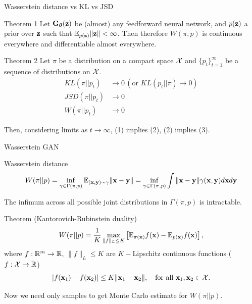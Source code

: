 \begin{frame}{Wasserstein distance vs KL vs JSD}
	\begin{block}{Theorem 1}
		Let $\mathbf{G}_{\boldsymbol{\theta}}(\mathbf{z})$ be (almost) any feedforward neural network, and $p(\mathbf{z})$ a prior over $\mathbf{z}$ such that $\mathbb{E}_{p(\mathbf{z})} \|\mathbf{z}\| < \infty$. Then therefore $W(\pi, p)$ is continuous everywhere and differentiable almost everywhere.
	\end{block}
	\begin{block}{Theorem 2}
		Let $\pi$ be a distribution on a compact space $\mathcal{X}$ and $\{p_t\}_{t=1}^\infty$ be a sequence of distributions on $\mathcal{X}$. 
		\begin{align}
			KL(\pi || p_t) &\rightarrow 0 \, (\text{or }KL (p_t || \pi) \rightarrow 0) \\
			JSD(\pi || p_t) &\rightarrow 0 \\
			W(\pi || p_t) &\rightarrow 0
		\end{align}
		
		Then, considering limits as $t \rightarrow \infty$, (1) implies (2), (2) implies (3).
	\end{block}
\end{frame}
\begin{frame}{Wasserstein GAN}
	\begin{block}{Wasserstein distance}
		\vspace{-0.5cm}
		\[
		W(\pi || p) = \inf_{\gamma \in \Gamma(\pi, p)} \mathbb{E}_{(\mathbf{x}, \mathbf{y}) \sim \gamma} \| \mathbf{x} - \mathbf{y} \| =  \inf_{\gamma \in \Gamma(\pi, p)} \int \| \mathbf{x} - \mathbf{y} \| \gamma (\mathbf{x}, \mathbf{y}) d \mathbf{x} d \mathbf{y}
		\]
		\vspace{-0.3cm}
	\end{block}
	The infimum across all possible joint distributions in $\Gamma(\pi, p)$ is intractable.
	\begin{block}{Theorem (Kantorovich-Rubinstein duality)}
		\vspace{-0.3cm}
		\[
		W(\pi || p) = \frac{1}{K} \max_{\| f \|_L \leq K} \left[ \mathbb{E}_{\pi(\mathbf{x})} f(\mathbf{x})  - \mathbb{E}_{p(\mathbf{x})} f(\mathbf{x})\right],
		\]
		where $f : \mathbb{R}^m \rightarrow \mathbb{R}$, $\| f \|_L \leq K$ are $K-$Lipschitz continuous functions ($f: \mathcal{X} \rightarrow \mathbb{R}$)
		\vspace{-0.2cm}
		\[
		|f(\mathbf{x}_1) - f(\mathbf{x}_2)| \leq K \| \mathbf{x}_1 - \mathbf{x}_2 \|, \quad \text{for all } \mathbf{x}_1, \mathbf{x}_2 \in \mathcal{X}.
		\]
		\vspace{-0.6cm}
	\end{block}
	Now we need only samples to get Monte Carlo estimate for $W(\pi || p)$.
	
\end{frame}
